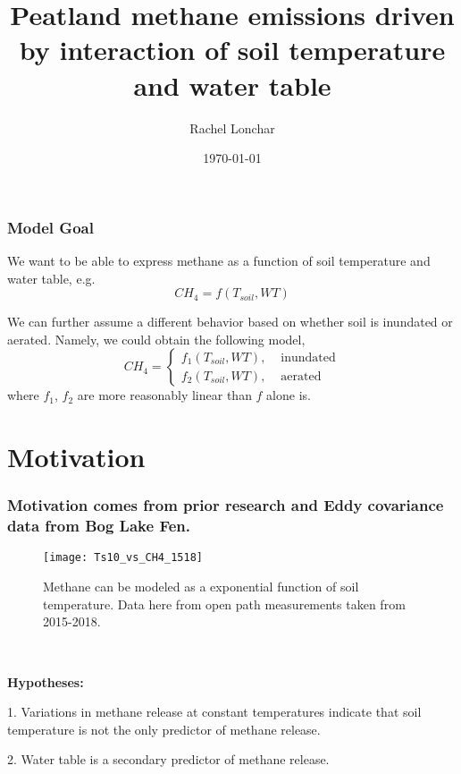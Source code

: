 \documentclass{beamer}
\title[Peatland methane fluctuations]{Peatland methane emissions driven by interaction of soil temperature and water table 
} %
\author{Rachel Lonchar}
\institute[UMN] %
{University of Minnesota \\ %
\medskip
\textit{lonch002@umn.edu} %
}
\date{\today} %
\begin{document}
\begin{frame}
\titlepage %
\end{frame}
\begin{frame}
\frametitle{Model Goal} %
We want to be able to express methane as a function of soil temperature and water table, e.g. 
\[CH_4 = f(T_{soil},WT) \]

We can further assume a different behavior based on whether soil is inundated or aerated. Namely, we could obtain the following model,
 \[
        CH_4=
\begin{cases}
f_1(T_{soil},WT), & \text{ inundated} \\
f_2(T_{soil},WT), & \text{ aerated} 
\end{cases}
  \]
where $f_1$, $f_2$ are more reasonably linear than $f$ alone is. 
\end{frame}

\section{Motivation}
\begin{frame}
\frametitle{Motivation comes from prior research and Eddy covariance data from Bog Lake Fen.}
\begin{figure}[!htb]
\centering
\texttt{[image: Ts10\_vs\_CH4\_1518]}
\caption{Methane can be modeled as a exponential function of soil temperature. Data here from open path measurements taken from 2015-2018.}
\end{figure}
~

\textbf{Hypotheses:}
 
1. Variations in methane release at constant temperatures indicate that soil temperature is not the only predictor of methane release. 

2. Water table is a secondary predictor of methane release.
\end{frame}
\end{document}
